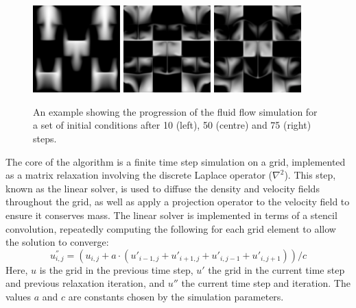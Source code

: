 \begin{figure}
    \begin{center}
        \includegraphics[width=0.3\textwidth]{images/sec-6/fluid/fluid-10}
        \includegraphics[width=0.3\textwidth]{images/sec-6/fluid/fluid-50}
        \includegraphics[width=0.3\textwidth]{images/sec-6/fluid/fluid-75}
    \end{center}
    \caption[Example of the fluid flow simulation]{An example showing the
        progression of the fluid flow simulation for a set of initial conditions
        after 10 (left), 50 (centre) and 75 (right) steps.}
    \label{fig:fluid_steps}
\end{figure}

The core of the algorithm is a finite time step simulation on a grid,
implemented as a matrix relaxation involving the discrete Laplace operator
($\nabla^2$). This step, known as the linear solver, is used to diffuse the
density and velocity fields throughout the grid, as well as apply a projection
operator to the velocity field to ensure it conserves mass. The linear solver is
implemented in terms of a stencil convolution, repeatedly computing the
following for each grid element to allow the solution to converge:
\[
u_{i,j}^{''} = \left( u_{i,j} + a \cdot \left( u'_{i-1,j}+u'_{i+1,j}+u'_{i,j-1}+u'_{i,j+1} \right) \right) / c
\]
Here, $u$ is the grid in the previous time step, $u'$ the grid in the current
time step and previous relaxation iteration, and $u''$ the current time step and
iteration. The values $a$ and $c$ are constants chosen by the simulation
parameters.

